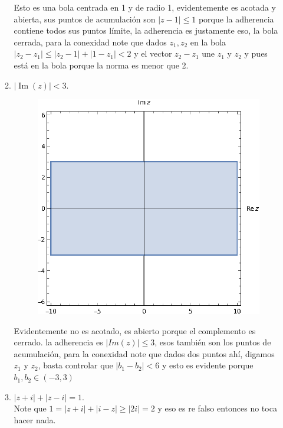 \documentclass[11pt]{article}
\begin{document}
\begin{enumerate}
\begin{enumerate}
        Esto es una bola centrada en 1 y de radio 1, evidentemente es acotada y abierta, sus puntos de acumulación son $|z-1|\leq 1$ porque la adherencia contiene todos sus puntos límite, la adherencia es justamente eso, la bola cerrada, para la conexidad note que dados $z_1,z_2$ en la bola $|z_2-z_1|\leq|z_2-1|+|1-z_1|<2$ y el vector $z_2-z_1$ une $z_1$ y $z_2$ y pues está en la bola porque la norma es menor que 2.

        \item $|\operatorname{Im}(z)| < 3$.
        

 \begin{figure}[H]
         \centering
         \includegraphics[scale=0.85]{Graphics/8b.eps}
         \end{figure}

Evidentemente no es acotado, es abierto porque el complemento es cerrado. la adherencia es $|Im(z)|\leq 3$, esos también son los puntos de acumulación, para la conexidad note que dados dos puntos ahí, digamos $z_1$ y $z_2$, basta controlar que $|b_1-b_2|<6$ y esto es evidente porque $b_1,b_2\in (-3,3)$

        \item $|z + i| + |z - i| = 1$.\\
Note que $1=|z+i|+|i-z|\geq |2i|=2$ y eso es re falso entonces no toca hacer nada.


\end{enumerate}
\end{enumerate}
\end{document}
